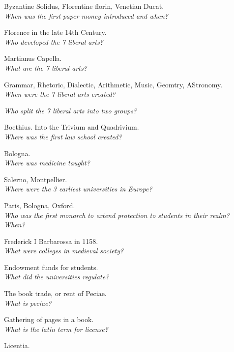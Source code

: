 \documentclass[12pt]{article}
\begin{document}
Byzantine Solidus, Florentine florin, Venetian Ducat.\\

\textit{When was the first paper money introduced and when?}

Florence in the late 14th Century.\\

\textit{Who developed the 7 liberal arts?}

Martianus Capella.\\

\textit{What are the 7 liberal arts?}

Grammar, Rhetoric, Dialectic, Arithmetic, Music, Geomtry, AStronomy.\\

\textit{When were the 7 liberal arts created?}

\textit{Who split the 7 liberal arts into two groups?}

Boethius. Into the Trivium and Quadrivium.\\

\textit{Where was the first law school created?}

Bologna.\\

\textit{Where was medicine taught?}

Salerno, Montpellier.\\

\textit{Where were the 3 earliest universities in Europe?}

Paris, Bologna, Oxford.\\

\textit{Who was the first monarch to extend protection to students in their realm? When?}

Frederick I Barbarossa in 1158.\\

\textit{What were colleges in medieval society?}

Endowment funds for students.\\

\textit{What did the universities regulate?}

The book trade, or rent of Peciae.\\

\textit{What is peciae?}

Gathering of pages in a book.\\

\textit{What is the latin term for license?}

Licentia.\\
\end{document}
